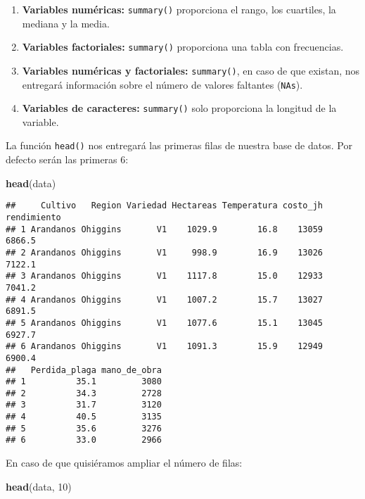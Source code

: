 \documentclass[]{book}
\newenvironment{Shaded}{\begin{snugshade}}{\end{snugshade}}
\newcommand{\DecValTok}[1]{\textcolor[rgb]{0.00,0.00,0.81}{#1}}
\newcommand{\KeywordTok}[1]{\textcolor[rgb]{0.13,0.29,0.53}{\textbf{#1}}}
\newcommand{\NormalTok}[1]{#1}
\providecommand{\tightlist}{%
  \setlength{\itemsep}{0pt}\setlength{\parskip}{0pt}}
\begin{document}
\begin{enumerate}
\def\labelenumi{\arabic{enumi}.}
\tightlist
\item
  \textbf{Variables numéricas:} \texttt{summary()} proporciona el rango, los cuartiles, la mediana y la media.
\item
  \textbf{Variables factoriales:} \texttt{summary()} proporciona una tabla con frecuencias.
\item
  \textbf{Variables numéricas y factoriales:} \texttt{summary()}, en caso de que existan, nos entregará información sobre el número de valores faltantes (\texttt{NAs}).
\item
  \textbf{Variables de caracteres:} \texttt{summary()} solo proporciona la longitud de la variable.
\end{enumerate}

La función \texttt{head()} nos entregará las primeras filas de nuestra base de datos. Por defecto serán las primeras 6:

\begin{Shaded}
\begin{Highlighting}[]
\KeywordTok{head}\NormalTok{(data)}
\end{Highlighting}
\end{Shaded}

\begin{verbatim}
##     Cultivo   Region Variedad Hectareas Temperatura costo_jh rendimiento
## 1 Arandanos Ohiggins       V1    1029.9        16.8    13059      6866.5
## 2 Arandanos Ohiggins       V1     998.9        16.9    13026      7122.1
## 3 Arandanos Ohiggins       V1    1117.8        15.0    12933      7041.2
## 4 Arandanos Ohiggins       V1    1007.2        15.7    13027      6891.5
## 5 Arandanos Ohiggins       V1    1077.6        15.1    13045      6927.7
## 6 Arandanos Ohiggins       V1    1091.3        15.9    12949      6900.4
##   Perdida_plaga mano_de_obra
## 1          35.1         3080
## 2          34.3         2728
## 3          31.7         3120
## 4          40.5         3135
## 5          35.6         3276
## 6          33.0         2966
\end{verbatim}

En caso de que quisiéramos ampliar el número de filas:

\begin{Shaded}
\begin{Highlighting}[]
\KeywordTok{head}\NormalTok{(data, }\DecValTok{10}\NormalTok{)}
\end{Highlighting}
\end{Shaded}
\end{document}
